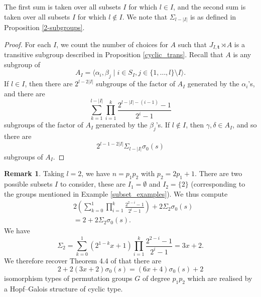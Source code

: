 \documentclass[a4paper,reqno]{amsart}
\theoremstyle{definition}
\newtheorem{remark}[theorem]{Remark}
\newcommand{\bt}{\textbf{t}}
\begin{document}
    The first sum is taken over all subsets $I$ for which $l \in I$, and the second sum is taken over all subsets $I$ for which $l \notin I$. We note that $\Sigma_{l-|I|}$ is as defined in Proposition \ref{2-subgroups}.
\begin{proof}
    For each $I$, we count the number of choices for $A$ such that $J_{I,\bt}\rtimes A$ is a transitive subgroup described in Proposition \ref{cyclic_trans}. Recall that $A$ is any subgroup of
    \[A_I=\langle \alpha_i,\beta_j \mid i \in S_I,j \in \{1,\ldots,l\} \setminus I \rangle.\]
    If $l \in I$, then there are $2^{l-2|I|}$ subgroups of the factor of $A_I$ generated by the $\alpha_i$'s, and there are
     \[\sum_{k=1}^{l-|I|}\prod_{i=1}^k\frac{2^{l-|I|-(i-1)}-1}{2^i-1}\]
    subgroups of the factor of $A_I$ generated by the $\beta_j$'s. If $l \notin I$, then $\gamma,\delta \in A_I$, and so there are
    \[2^{l-1-2|I|}\Sigma_{l-|I|}\sigma_0(s)\]
    subgroups of $A_I$.
\end{proof}

\begin{remark}\label{cyclic_SG}
    Taking $l=2$, we have $n=p_1p_2$ with $p_2=2p_1+1$. There are two possible subsets $I$ to consider, these are $I_1=\emptyset$ and $I_2=\{2\}$ (corresponding to the groups mentioned in Example \ref{subset_examples}). We thus compute
    \begin{align*}
	&2\left(\sum_{k=0}^1\prod_{i=1}^k\frac{2^{2-i}-1}{2^i-1}\right)+2\Sigma_2\sigma_0(s)\\
	&=2+2\Sigma_2\sigma_0(s).
    \end{align*}
    We have
    \[\Sigma_2=\sum_{k=0}^1(2^{1-k}x+1)\prod_{i=1}^k\frac{2^{2-i}-1}{2^i-1}=3x+2.\]
    We therefore recover Theorem 4.4 of \cite{BML21} that there are
    \[2+2(3x+2)\sigma_0(s)=(6x+4)\sigma_0(s)+2\]
    isomorphism types of permutation groups $G$ of degree $p_1p_2$ which are realised by a Hopf--Galois structure of cyclic type.
\end{remark}
\end{document}
